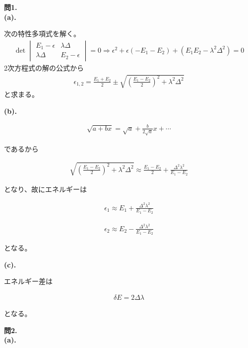 \documentclass{jlreq}
\begin{document}
\noindent
\textbf{問1.}\\


\noindent
\textbf{(a).}

次の特性多項式を解く。  
\begin{eqnarray}
    \det
    \begin{vmatrix}
        E_1-\epsilon & \lambda\Delta \\
        \lambda\Delta & E_2-\epsilon 
    \end{vmatrix}=0\Rightarrow \epsilon^2+\epsilon(-E_1-E_2)+(E_1E_2-\lambda^2\Delta^2)=0   
\end{eqnarray}  
2次方程式の解の公式から
\begin{eqnarray}
    \epsilon_{1,2}=\frac{E_1+E_2}{2}\pm\sqrt{\left(\frac{E_1-E_2}{2}\right)^2+\lambda^2\Delta^2}
\end{eqnarray}  
と求まる。

\noindent
\textbf{(b).}

\begin{eqnarray}
    \sqrt{a+bx}=\sqrt{a}+\frac{b}{2\sqrt{a}}x+\cdots
\end{eqnarray}  

であるから

\begin{eqnarray}
    \sqrt{\left(\frac{E_1-E_2}{2}\right)^2+\lambda^2\Delta^2}\approx\frac{E_1-E_2}{2}+\frac{\Delta^2\lambda^2}{E_1-E_2}
\end{eqnarray}

となり、故にエネルギーは

\begin{eqnarray}
    \epsilon_1\approx E_1+\frac{\Delta^2\lambda^2}{E_1-E_2}
\end{eqnarray}

\begin{eqnarray}
    \epsilon_2\approx E_2-\frac{\Delta^2\lambda^2}{E_1-E_2}
\end{eqnarray}

となる。

\noindent
\textbf{(c).}

エネルギー差は

\begin{eqnarray}
\delta E=2\Delta\lambda
\end{eqnarray}

となる。

\clearpage

\noindent
\textbf{問2.}\\

\noindent
\textbf{(a).} 
\end{document}
